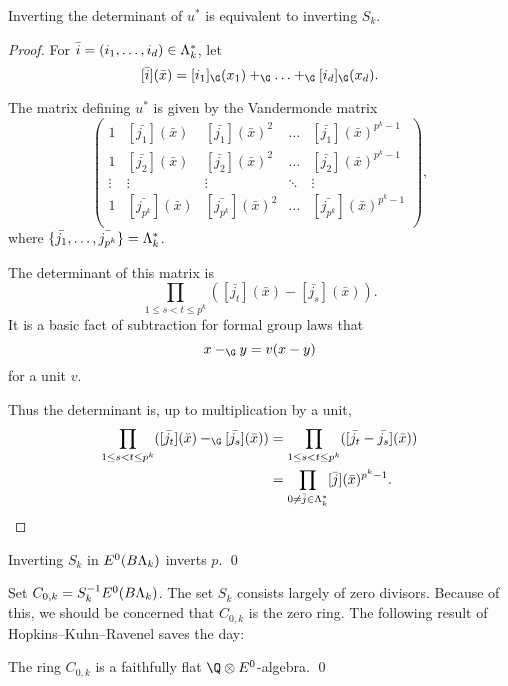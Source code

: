 \begin{lemma} \label{det}
Inverting the determinant of \(u^*\) is equivalent to inverting \(S_k\).
\end{lemma}
\begin{proof}
For \(\bar{i} = (i_1, \ldots, i_d) \in \Lambda_k^*\), let
\[
[\bar{i}](\bar{x}) = [i_1]_{\G}(x_1) +_{\G} \ldots +_{\G} [i_d]_{\G}(x_d).
\]

The matrix defining \(u^*\) is given by the Vandermonde matrix
\[
\left(
\begin{array}{ccccc}
1 & [\bar{j_1}](\bar{x}) & [\bar{j_1}](\bar{x})^2 & \ldots & [\bar{j_{1}}](\bar{x})^{p^k-1} \\
1 & [\bar{j_2}](\bar{x}) & [\bar{j_2}](\bar{x})^2 & \ldots & [\bar{j_{2}}](\bar{x})^{p^k-1}\\
\vdots & \vdots & \vdots & \ddots & \vdots \\
1 & [\bar{j_{p^k}}](\bar{x}) & [\bar{j_{p^k}}](\bar{x})^2 & \ldots & [\bar{j_{p^k}}](\bar{x})^{p^k-1}\\
\end{array} \right),
\]
where \(\{\bar{j_1},\ldots,\bar{j_{p^k}}\} = \Lambda_k^*\).

The determinant of this matrix is
\[
\prod_{1 \leq s < t \leq p^k} ([\bar{j_t}](\bar{x}) - [\bar{j_s}](\bar{x})).
\]
It is a basic fact of subtraction for formal group laws that
\[
x -_{\G} y = v(x-y)
\]
for a unit \(v\). 

Thus the determinant is, up to multiplication by a unit, 
\begin{align*}
\prod_{1 \leq s < t \leq p^k} ([\bar{j_t}](\bar{x}) -_{\G} [\bar{j_s}](\bar{x})) & = \prod_{1 \leq s < t \leq p^k} ([\bar{j_t} - \bar{j_s}](\bar{x})) \\
& = \prod_{0 \neq \bar{j} \in \Lk^*} [\bar{j}](\bar{x})^{p^k-1}. \qedhere
\end{align*} 
\end{proof}

\begin{corollary}
Inverting \(S_k\) in \(E^0(B\Lambda_k)\) inverts \(p\). \pushQED\qed \qedhere \popQED
\end{corollary}

Set \(C_{0,k} = S_{k}^{-1}E^0(B\Lambda_k)\).  The set \(S_k\) consists largely of zero divisors. Because of this, we should be concerned that \(C_{0,k}\) is the zero ring. The following result of Hopkins--Kuhn--Ravenel saves the day:

\begin{proposition}\label{CZeroIsFaithfullyFlat}
The ring \(C_{0,k}\) is a faithfully flat \(\Q \otimes E^0\)-algebra. \pushQED\qed \qedhere \popQED
\end{proposition}

